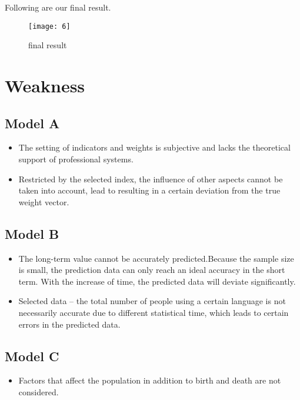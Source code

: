 \documentclass{mcmthesis}
\begin{document}
Following are our final result.
\begin{figure}[!ht]
  \centering
  \texttt{[image: 6]}
  \caption{ final result}
  \label{Resul}
\end{figure}



\section{Weakness}
\subsection{Model A}
\begin{itemize}
\item The setting of indicators and weights is subjective and lacks the theoretical support of professional systems.
\item Restricted by the selected index, the influence of other aspects cannot be taken into account, lead to resulting in a certain deviation from the true weight vector.
\end{itemize}
\subsection{Model B}
\begin{itemize}
\item The long-term value cannot be accurately predicted.Because the sample size is small, the prediction data can only reach an ideal accuracy in the short term. With the increase of time, the predicted data will deviate significantly.
\item  Selected data -- the total number of people using a certain language is not necessarily accurate due to different statistical time, which leads to certain errors in the predicted data.
\end{itemize}
\subsection{Model C}
\begin{itemize}
\item Factors that affect the population in addition to birth and death are not considered.
\end{itemize}
\end{document}
